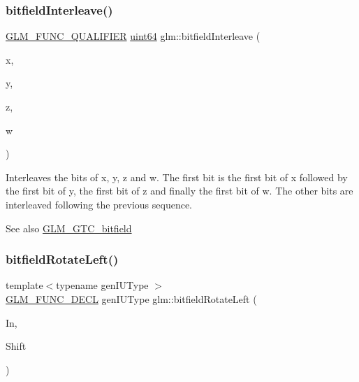\subsubsection{\texorpdfstring{bitfield\+Interleave()}{bitfieldInterleave()}\hspace{0.1cm}{\footnotesize\ttfamily [16/16]}}
{\footnotesize\ttfamily \mbox{\hyperlink{setup_8hpp_a33fdea6f91c5f834105f7415e2a64407}{G\+L\+M\+\_\+\+F\+U\+N\+C\+\_\+\+Q\+U\+A\+L\+I\+F\+I\+ER}} \mbox{\hyperlink{group__gtc__type__precision_gae3632bf9b37da66233d78930dd06378a}{uint64}} glm\+::bitfield\+Interleave (\begin{DoxyParamCaption}\item[{\mbox{\hyperlink{group__gtc__type__precision_gad8c2939e1fdd8e5828b31d95c52255d5}{uint16}}}]{x,  }\item[{\mbox{\hyperlink{group__gtc__type__precision_gad8c2939e1fdd8e5828b31d95c52255d5}{uint16}}}]{y,  }\item[{\mbox{\hyperlink{group__gtc__type__precision_gad8c2939e1fdd8e5828b31d95c52255d5}{uint16}}}]{z,  }\item[{\mbox{\hyperlink{group__gtc__type__precision_gad8c2939e1fdd8e5828b31d95c52255d5}{uint16}}}]{w }\end{DoxyParamCaption})}

Interleaves the bits of x, y, z and w. The first bit is the first bit of x followed by the first bit of y, the first bit of z and finally the first bit of w. The other bits are interleaved following the previous sequence.

\begin{DoxySeeAlso}{See also}
\mbox{\hyperlink{group__gtc__bitfield}{G\+L\+M\+\_\+\+G\+T\+C\+\_\+bitfield}} 
\end{DoxySeeAlso}
\mbox{\label{group__gtc__bitfield_ga2eb49678a344ce1495bdb5586d9896b9}} 
\subsubsection{\texorpdfstring{bitfield\+Rotate\+Left()}{bitfieldRotateLeft()}\hspace{0.1cm}{\footnotesize\ttfamily [1/2]}}
{\footnotesize\ttfamily template$<$typename gen\+I\+U\+Type $>$ \\
\mbox{\hyperlink{setup_8hpp_ab2d052de21a70539923e9bcbf6e83a51}{G\+L\+M\+\_\+\+F\+U\+N\+C\+\_\+\+D\+E\+CL}} gen\+I\+U\+Type glm\+::bitfield\+Rotate\+Left (\begin{DoxyParamCaption}\item[{gen\+I\+U\+Type}]{In,  }\item[{int}]{Shift }\end{DoxyParamCaption})}

